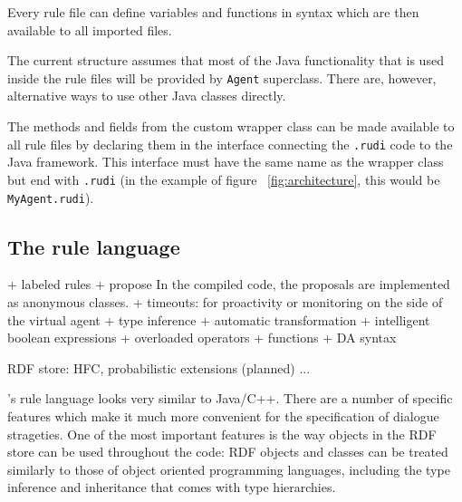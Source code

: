 Every rule file can define variables and functions in \vonda syntax which are
then available to all imported files.

The current structure assumes that most of the Java functionality that is used
inside the rule files will be provided by \texttt{Agent} superclass. There are,
however, alternative ways to use other Java classes directly.

The methods and fields from the custom wrapper class can be made available to all rule files by declaring them in the interface connecting the \texttt{.rudi} code to the Java framework. This interface must have the same name as the wrapper class but end with \texttt{.rudi} (in the example of figure ~\ref{fig:architecture}, this would be \texttt{MyAgent.rudi}).





\subsection{The \vonda rule language}

\label{sec:language}

+ labeled rules
+ propose
  In the compiled code, the proposals are implemented as anonymous classes.
+ timeouts: for proactivity or monitoring on the side of the virtual agent
+ type inference
+ automatic transformation
+ intelligent boolean expressions
+ overloaded operators
+ functions
+ DA syntax

RDF store: HFC, probabilistic extensions (planned) ...
\fi

\vonda's rule language looks very similar to Java/C++. There are a number of
specific features which make it much more convenient for the specification of
dialogue strageties. One of the most important features is the way objects in
the RDF store can be used throughout the code: RDF objects and classes can be
treated similarly to those of object oriented programming languages, including
the type inference and inheritance that comes with type hierarchies.

